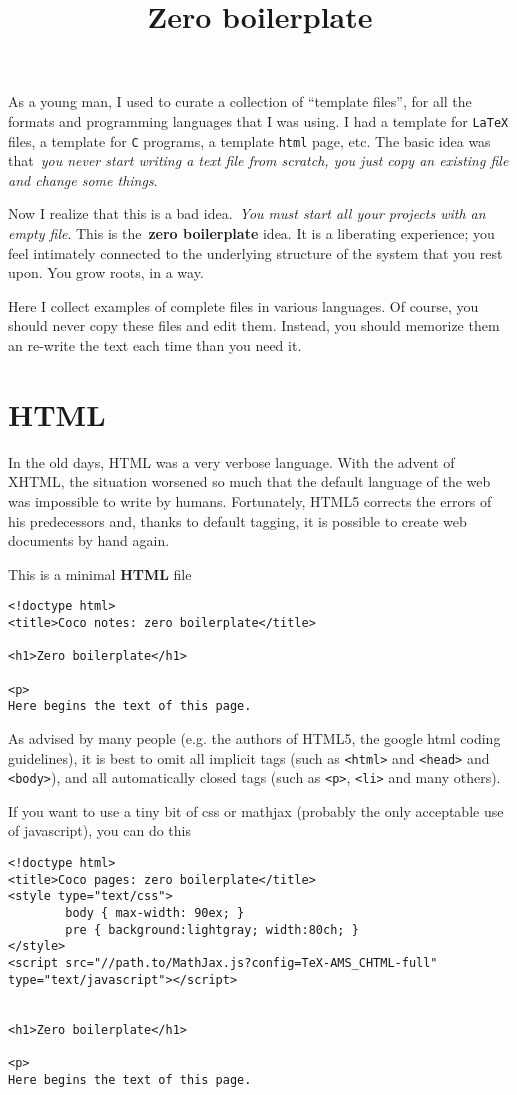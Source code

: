 \title{Zero boilerplate}

As a young man, I used to curate a collection of ``template files'', for all
the formats and programming languages that I was using.  I had a template for
\verb+LaTeX+ files, a template for \verb+C+ programs, a template \verb+html+
page, etc.  The basic idea was that~\emph{you never start writing a text file
from scratch, you just copy an existing file and change some things}.

Now I realize that this is a bad idea.~\emph{You must start all your projects
with an empty file}.  This is the~{\bf zero boilerplate} idea.  It is a
liberating experience; you feel intimately connected to the underlying
structure of the system that you rest upon.  You grow roots, in a way.

Here I collect examples of complete files in various languages.  Of course,
you should never copy these files and edit them.  Instead, you should
memorize them an re-write the text each time than you need it.

\section{HTML}

In the old days, HTML was a very verbose language.  With the advent of XHTML,
the situation worsened so much that the default language of the web was
impossible to write by humans.  Fortunately, HTML5 corrects the errors of his
predecessors and, thanks to default tagging, it is possible to create web
documents by hand again.

This is a minimal {\bf HTML} file
\begin{verbatim}
<!doctype html>
<title>Coco notes: zero boilerplate</title>

<h1>Zero boilerplate</h1>

<p>
Here begins the text of this page.
\end{verbatim}

As advised by many people (e.g. the authors of HTML5, the google html coding
guidelines), it is best to omit all implicit tags (such as \verb+<html>+ and
\verb+<head>+ and \verb+<body>+), and all automatically closed tags (such as
\verb+<p>+, \verb+<li>+ and many others).

If you want to use a tiny bit of css or mathjax (probably the only acceptable
use of javascript), you can do this
\begin{verbatim}
<!doctype html>
<title>Coco pages: zero boilerplate</title>
<style type="text/css">
        body { max-width: 90ex; }
        pre { background:lightgray; width:80ch; }
</style>
<script src="//path.to/MathJax.js?config=TeX-AMS_CHTML-full" type="text/javascript"></script>


<h1>Zero boilerplate</h1>

<p>
Here begins the text of this page.
\end{verbatim}

